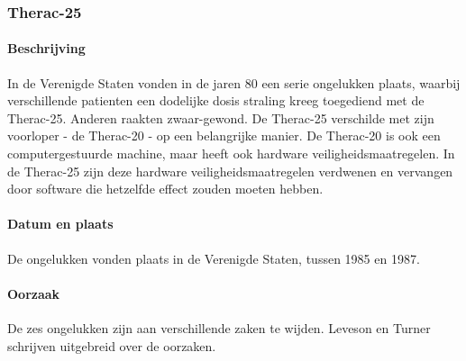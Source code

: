 \documentclass{article}
\begin{document}
			\subsubsection{Therac-25}

				\paragraph{Beschrijving}

				In de Verenigde Staten vonden in de jaren 80 een serie ongelukken plaats, waarbij verschillende patienten een dodelijke dosis straling kreeg toegediend met de Therac-25. Anderen raakten zwaar-gewond. De Therac-25 verschilde met zijn voorloper - de Therac-20 - op een belangrijke manier. De Therac-20 is ook een computergestuurde machine, maar heeft ook hardware veiligheidsmaatregelen. In de Therac-25 zijn deze hardware veiligheidsmaatregelen verdwenen en vervangen door software die hetzelfde effect zouden moeten hebben. \cite{thomas1994story} \par

				\paragraph{Datum en plaats}

				De ongelukken vonden plaats in de Verenigde Staten, tussen 1985 en 1987. \par

				\paragraph{Oorzaak}

				De zes ongelukken zijn aan verschillende zaken te wijden. Leveson en Turner schrijven uitgebreid over de oorzaken. \cite{274940} \par
\end{document}
